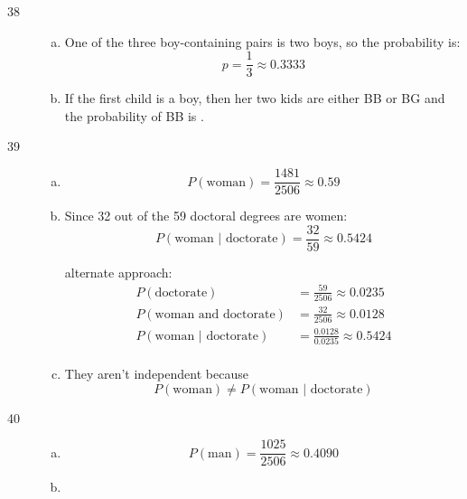 \documentclass[letterpaper]{exam}
\begin{document}
\begin{description}
    \item[38]
      \begin{enumerate}[(a)]
        \item One of the three boy-containing pairs is two boys, so the
          probability is:
          \[
            p = \frac{1}{3} \approx \boxed{ 0.3333 }
          \]

        \item If the first child is a boy, then her two kids are either BB or
          BG and the probability of BB is .
      \end{enumerate}

    \item[39]
      \begin{enumerate}[(a)]
        \item 
          \[
            P(\text{woman}) = \frac{1481}{2506} \approx \boxed{ 0.59 }
          \]

        \item
          Since 32 out of the 59 doctoral degrees are women:
          \[
            P( \text{woman } | \text { doctorate} ) = \frac{32}{59} 
              \approx \boxed{ 0.5424 }
          \]

          alternate approach:
          \begin{align*}
            P( \text{doctorate} )                   & = \frac{59}{2506} \approx 0.0235 \\
            P( \text{woman and doctorate} )         & = \frac{32}{2506} \approx 0.0128 \\
            P( \text{woman } | \text { doctorate} ) & = \frac{0.0128}{0.0235}
              \approx 0.5424 \\
          \end{align*}

        \item They aren't independent because 
          \[
            P(\text {woman}) \neq P( \text{woman } | \text { doctorate} )
          \]

      \end{enumerate}

    \item[40]
      \begin{enumerate}[(a)]
        \item 
          \[
            P(\text{man}) = \frac{1025}{2506} \approx \boxed{ 0.4090 }
          \]

        \item


\end{enumerate}
\end{description}
\end{document}
